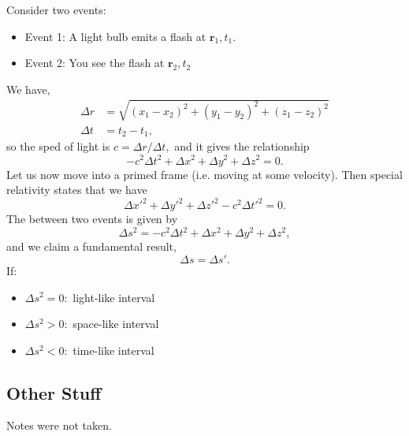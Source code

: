 \documentclass{article}
\numberwithin{equation}{section}
\begin{document}
Consider two events:
\begin{itemize}
    \item Event 1: A light bulb emits a flash at $\bm{r}_1,t_1.$
    \item Event 2: You see the flash at $\bm{r}_2,t_2$
\end{itemize}
We have,
\begin{align}
    \Delta r &= \sqrt{(x_1-x_2)^2 + (y_1-y_2)^2 + (z_1-z_2)^2} \\ 
    \Delta t &= t_2 - t_1,
\end{align}
so the sped of light is $c=\Delta r/\Delta t,$ and it gives the relationship 
\begin{equation}
    -c^2\Delta t^2 + \Delta x^2 + \Delta y^2 + \Delta z^2 = 0.
\end{equation} 
Let us now move into a primed frame (i.e. moving at some velocity). Then special relativity states that we have 
\begin{equation}
    \Delta x'^2 + \Delta y'^2 + \Delta z'^2 - c^2\Delta t'^2 = 0.
\end{equation}
The  between two events is given by 
\begin{equation}
    \Delta s^2 = -c^2\Delta t^2 + \Delta x^2 + \Delta y^2 + \Delta z^2,
\end{equation}
and we claim a fundamental result,
\begin{equation}
    \Delta s = \Delta s'.
\end{equation}
If:
\begin{itemize}
    \item $\Delta s^2 =0:$ light-like interval
    \item $\Delta s^2 > 0:$ space-like interval
    \item $\Delta s^2 < 0:$ time-like interval
\end{itemize}
\subsection{Other Stuff}
Notes were not taken.
\end{document}
